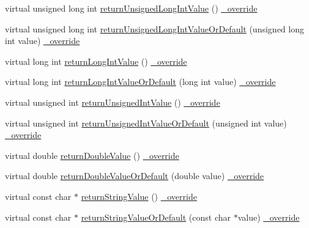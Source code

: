 \begin{DoxyCompactItemize}
\item 
virtual unsigned long int \hyperlink{class_mock_ignored_actual_call_a7c11c6fe894c16554db67a13023f7b4f}{return\+Unsigned\+Long\+Int\+Value} () \hyperlink{_cpp_u_test_config_8h_a049bea15dd750e15869863c94c1efc3b}{\+\_\+override}
\item 
virtual unsigned long int \hyperlink{class_mock_ignored_actual_call_acd7bb1907354f846c5c5b4442eb9314c}{return\+Unsigned\+Long\+Int\+Value\+Or\+Default} (unsigned long int value) \hyperlink{_cpp_u_test_config_8h_a049bea15dd750e15869863c94c1efc3b}{\+\_\+override}
\item 
virtual long int \hyperlink{class_mock_ignored_actual_call_a6ae9794109d2d3ad8445bde2ba6003fd}{return\+Long\+Int\+Value} () \hyperlink{_cpp_u_test_config_8h_a049bea15dd750e15869863c94c1efc3b}{\+\_\+override}
\item 
virtual long int \hyperlink{class_mock_ignored_actual_call_ab472e7fe58130fbbd4b99cb5b81a0411}{return\+Long\+Int\+Value\+Or\+Default} (long int value) \hyperlink{_cpp_u_test_config_8h_a049bea15dd750e15869863c94c1efc3b}{\+\_\+override}
\item 
virtual unsigned int \hyperlink{class_mock_ignored_actual_call_a9c26f95d67ffe03d6d0ffc50fb4cf07a}{return\+Unsigned\+Int\+Value} () \hyperlink{_cpp_u_test_config_8h_a049bea15dd750e15869863c94c1efc3b}{\+\_\+override}
\item 
virtual unsigned int \hyperlink{class_mock_ignored_actual_call_a2bc9b331b1e836d8d3bbb53b324f9b7f}{return\+Unsigned\+Int\+Value\+Or\+Default} (unsigned int value) \hyperlink{_cpp_u_test_config_8h_a049bea15dd750e15869863c94c1efc3b}{\+\_\+override}
\item 
virtual double \hyperlink{class_mock_ignored_actual_call_a42da8c7f9341314295bef6aa2b79a086}{return\+Double\+Value} () \hyperlink{_cpp_u_test_config_8h_a049bea15dd750e15869863c94c1efc3b}{\+\_\+override}
\item 
virtual double \hyperlink{class_mock_ignored_actual_call_ad2509ddf391dec670fbff24f7491dc64}{return\+Double\+Value\+Or\+Default} (double value) \hyperlink{_cpp_u_test_config_8h_a049bea15dd750e15869863c94c1efc3b}{\+\_\+override}
\item 
virtual const char $\ast$ \hyperlink{class_mock_ignored_actual_call_aca3e568bda04bc679190d0f9e8d24360}{return\+String\+Value} () \hyperlink{_cpp_u_test_config_8h_a049bea15dd750e15869863c94c1efc3b}{\+\_\+override}
\item 
virtual const char $\ast$ \hyperlink{class_mock_ignored_actual_call_a606d5fe04c4eff47845beee60129974d}{return\+String\+Value\+Or\+Default} (const char $\ast$value) \hyperlink{_cpp_u_test_config_8h_a049bea15dd750e15869863c94c1efc3b}{\+\_\+override}

\end{DoxyCompactItemize}
